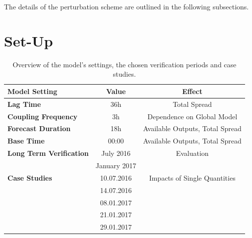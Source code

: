 The details of the perturbation scheme are outlined in the following subsections.


\section{Set-Up}

\begin{table}[h]
    \footnotesize
    \centering
    \begin{tabular}{|l|c|c|}
        \hline
        \rule{0pt}{16pt}{\large \textbf{Model Setting}}&{\large \textbf{Value}}&{\large \textbf{Effect} }\\ 
        \hline
        \hline
        \textbf{Lag Time}&36h&Total Spread\\
        \hline
        \textbf{Coupling Frequency}&3h&Dependence on Global Model\\
        \hline
        \textbf{Forecast Duration}&18h&Available Outputs, Total Spread\\
        \hline
        \textbf{Base Time}&00:00&Available Outputs, Total Spread\\
        \hline
        \textbf{Long Term Verification}&July 2016&Evaluation\\
         &January 2017&\\
        \hline
        \textbf{Case Studies} &10.07.2016&Impacts of Single Quantities\\
        & 14.07.2016&\\
        &08.01.2017&\\
        &21.01.2017&\\
        &29.01.2017&\\
        \hline
    \end{tabular}
    \caption{Overview of the model's settings, the chosen verification periods and case studies.}
    \label{tab:modelparam}
\end{table}

